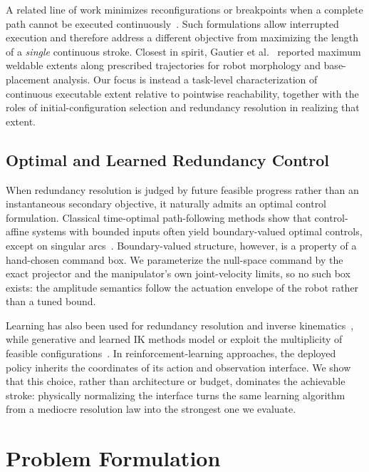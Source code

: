 \documentclass[journal, twoside]{IEEEtran}
\begin{document}
A related line of work minimizes reconfigurations or breakpoints when a
complete path cannot be executed continuously~\cite{wang2024iklink,yang2022optimal,yin2024breakpoints}.
Such formulations allow interrupted execution and therefore address a
different objective from maximizing the length of a \emph{single}
continuous stroke. Closest in spirit, Gautier et
al.~\cite{gautier2024comparison} reported maximum weldable extents along
prescribed trajectories for robot morphology and base-placement analysis.
Our focus is instead a task-level characterization of continuous
executable extent relative to pointwise reachability, together with the
roles of initial-configuration selection and redundancy resolution in
realizing that extent.

\subsection{Optimal and Learned Redundancy Control}

When redundancy resolution is judged by future feasible progress rather
than an instantaneous secondary objective, it naturally admits an optimal
control formulation. Classical time-optimal path-following methods show
that control-affine systems with bounded inputs often yield
boundary-valued optimal controls, except on singular
arcs~\cite{bobrow1985time,shin1985minimum}. Boundary-valued structure,
however, is a property of a hand-chosen command box. We parameterize the
null-space command by the exact projector and the manipulator's own
joint-velocity limits, so no such box exists: the amplitude semantics
follow the actuation envelope of the robot rather than a tuned bound.

Learning has also been used for redundancy resolution and inverse
kinematics~\cite{malik2022deep}, while generative and learned IK methods
model or exploit the multiplicity of feasible
configurations~\cite{ames2022ikflow,zhang2025ikdiffuser,huang2024diffusionseeder,yoon2023learning}.
In reinforcement-learning approaches, the deployed policy inherits the
coordinates of its action and observation interface. We show that this
choice, rather than architecture or budget, dominates the achievable
stroke: physically normalizing the interface turns the same learning
algorithm from a mediocre resolution law into the strongest one we
evaluate.


\section{Problem Formulation}
\end{document}
